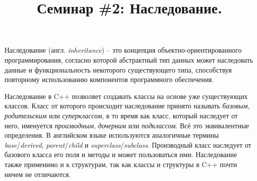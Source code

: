 \documentclass{article}
\begin{document}
\title{Семинар \#2: Наследование. \vspace{-5ex}}\date{}\maketitle
Наследование (англ. \textit{inheritance}) -- это концепция объектно-ориентированного программирования, согласно которой абстрактный тип данных может наследовать данные и функциональность некоторого существующего типа, способствуя повторному использованию компонентов программного обеспечения.

Наследование в C++ позволяет создавать классы на основе уже существующих классов. Класс от которого происходит наследование принято называть \textit{базовым}, \textit{родительским} или \textit{суперклассом}, в то время как класс, который наследует от него, именуется \textit{производным}, \textit{дочерним} или \textit{подклассом}. Всё это эквивалентные определения. В английском языке используются аналогичные термины \textit{base}/\textit{derived}, \textit{parent}/\textit{child} и \textit{superclass}/\textit{subclass}. Производный класс наследует от базового класса его поля и методы и может пользоваться ими. Наследование также применимо и к структурам, так как классы и структуры в C++ почти ничем не отличаются.
\end{document}

